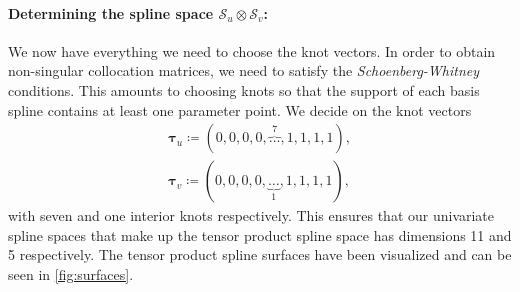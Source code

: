 \documentclass[article]{memoir}
\newcommand{\tu}{\boldsymbol{\tau}_u}
\newcommand{\tv}{\boldsymbol{\tau}_v}
\renewcommand{\S}{\mathcal{S}}
\begin{document}
\paragraph{Determining the spline space \(\S_u \otimes \S_v\):}
We now have everything we need to choose the knot vectors. In order to obtain
non-singular collocation matrices, we need to satisfy the
\emph{Schoenberg-Whitney} conditions. This amounts to choosing knots so that
the support of each basis spline contains at least one parameter point.  We
decide on the knot vectors
\begin{align*}
    \tu \coloneqq (0, 0, 0 , 0, \overbrace{\dots}^{7}, 1, 1, 1, 1), \\
    \tv \coloneqq (0, 0, 0, 0, \underbrace{\dots}_{1}, 1, 1, 1, 1), 
\end{align*}
with seven and one interior knots respectively. This ensures that our
univariate spline spaces that make up the tensor product spline space has
dimensions 11 and 5 respectively. The tensor product spline surfaces have been
visualized and can be seen in \cref{fig:surfaces}.
\end{document}
